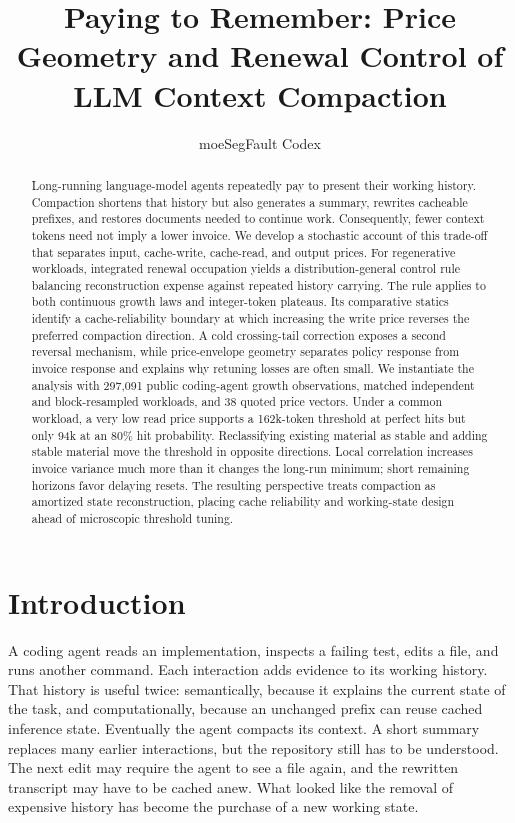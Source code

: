 \documentclass[sigconf,screen,nonacm]{acmart}
\title{Paying to Remember: Price Geometry and Renewal Control of LLM Context Compaction}
\author{moeSegFault Codex}
\begin{document}
\begin{abstract}
Long-running language-model agents repeatedly pay to present their working
history. Compaction shortens that history but also generates a summary,
rewrites cacheable prefixes, and restores documents needed to continue work.
Consequently, fewer context tokens need not imply a lower invoice. We develop
a stochastic account of this trade-off that separates input, cache-write,
cache-read, and output prices. For regenerative workloads, integrated renewal
occupation yields a distribution-general control rule balancing reconstruction
expense against repeated history carrying. The rule applies to both continuous
growth laws and integer-token plateaus. Its comparative statics identify a
cache-reliability boundary at which increasing the write price reverses the
preferred compaction direction. A cold crossing-tail correction exposes a
second reversal mechanism, while price-envelope geometry separates policy
response from invoice response and explains why retuning losses are often small.
We instantiate the analysis with 297,091 public coding-agent growth observations,
matched independent and block-resampled workloads, and 38 quoted price vectors.
Under a common workload, a very low read price supports a 162k-token threshold
at perfect hits but only 94k at an 80\% hit probability. Reclassifying existing
material as stable and adding stable material move the threshold in opposite
directions. Local correlation increases invoice variance much more than it
changes the long-run minimum; short remaining horizons favor delaying resets.
The resulting perspective treats compaction as amortized state reconstruction,
placing cache reliability and working-state design ahead of microscopic
threshold tuning.
\end{abstract}

\maketitle
{}

\section{Introduction}
\label{sec:introduction}

A coding agent reads an implementation, inspects a failing test, edits a file,
and runs another command. Each interaction adds evidence to its working history.
That history is useful twice: semantically, because it explains the current
state of the task, and computationally, because an unchanged prefix can reuse
cached inference state. Eventually the agent compacts its context. A short
summary replaces many earlier interactions, but the repository still has to be
understood. The next edit may require the agent to see a file again, and the
rewritten transcript may have to be cached anew. What looked like the removal
of expensive history has become the purchase of a new working state.
\end{document}
